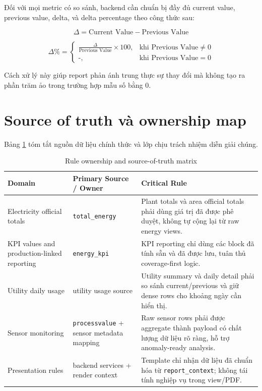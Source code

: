 Đối với mọi metric có so sánh, backend cần chuẩn bị đầy đủ current value, previous value, delta, và delta percentage theo công thức sau:

\begin{equation}
	\Delta = \text{Current Value} - \text{Previous Value}
	\label{eq:delta_value}
\end{equation}

\begin{equation}
	\Delta\% = \begin{cases}
		\frac{\Delta}{\text{Previous Value}} \times 100, & \text{khi Previous Value} \neq 0 \\
		\texttt{-}, & \text{khi Previous Value} = 0
	\end{cases}
	\label{eq:delta_pct}
\end{equation}

Cách xử lý này giúp report phản ánh trung thực sự thay đổi mà không tạo ra phần trăm ảo trong trường hợp mẫu số bằng 0.

\section{Source of truth và ownership map}

Bảng \ref{tab:rule_ownership_matrix} tóm tắt nguồn dữ liệu chính thức và lớp chịu trách nhiệm diễn giải chúng.

\begin{table}[htbp]
	\centering
	\renewcommand{\arraystretch}{1.3}
	\caption{Rule ownership and source-of-truth matrix}
	\label{tab:rule_ownership_matrix}
	\begin{tabularx}{\linewidth}{|>{\RaggedRight\arraybackslash}p{3.1cm}|>{\RaggedRight\arraybackslash}p{3.2cm}|>{\RaggedRight\arraybackslash}X|}
		\hline
		\textbf{Domain} & \textbf{Primary Source / Owner} & \textbf{Critical Rule} \\ \hline
		Electricity official totals & \texttt{total\_energy} & Plant totals và area official totals phải dùng giá trị đã được phê duyệt, không tự cộng lại từ raw energy views. \\ \hline
		KPI values and production-linked reporting & \texttt{energy\_kpi} & KPI reporting chỉ dùng các block đã tính sẵn và đã được lưu, tuân thủ coverage-first logic. \\ \hline
		Utility daily usage & utility usage source & Utility summary và daily detail phải so sánh current/previous và giữ dense rows cho khoảng ngày cần hiển thị. \\ \hline
		Sensor monitoring & \texttt{processvalue} + sensor metadata mapping & Raw sensor rows phải được aggregate thành payload có chất lượng dữ liệu rõ ràng, hỗ trợ anomaly-ready analysis. \\ \hline
		Presentation rules & backend services + render context & Template chỉ nhận dữ liệu đã chuẩn hóa từ \texttt{report\_context}; không tái tính nghiệp vụ trong view/PDF. \\ \hline
	\end{tabularx}
\end{table}

